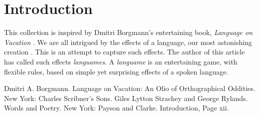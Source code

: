 \documentclass[a6paper]{article}
\begin{document}
\section{Introduction}
This collection is inspired by Dmitri Borgmann's entertaining book, \emph{Language on Vacation} \cite{lov}. We are all intrigued by the effects of a language, our most astonishing creation \cite{wap}. This is an attempt to capture such effects. The author of this article has called such effects \emph{languames}. A \emph{languame} is an entertaining game, with flexible rules, based on simple yet surprising effects of a spoken language.

\begin{thebibliography}{00}
     Dmitri A. Borgmann. Language on Vacation: An Olio of Orthographical Oddities. New York: Charles Scribner's Sons.
     Giles Lytton Strachey and George Rylands. Words and Poetry. New York: Payson and Clarke. Introduction, Page xii.
\end{thebibliography}
\end{document}
